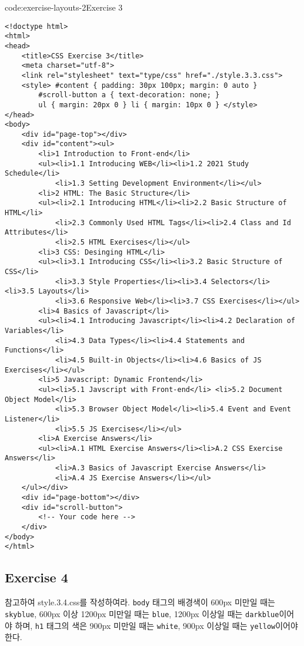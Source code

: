 \begin{codeenv}{code:exercise-layouts-2}{Exercise 3}\begin{verbatim}
<!doctype html>
<html>
<head>
    <title>CSS Exercise 3</title>
    <meta charset="utf-8">
    <link rel="stylesheet" text="type/css" href="./style.3.3.css">
    <style> #content { padding: 30px 100px; margin: 0 auto }
        #scroll-button a { text-decoration: none; }
        ul { margin: 20px 0 } li { margin: 10px 0 } </style>
</head>
<body>
    <div id="page-top"></div>
    <div id="content"><ul>
        <li>1 Introduction to Front-end</li>
        <ul><li>1.1 Introducing WEB</li><li>1.2 2021 Study Schedule</li>
            <li>1.3 Setting Development Environment</li></ul>
        <li>2 HTML: The Basic Structure</li>
        <ul><li>2.1 Introducing HTML</li><li>2.2 Basic Structure of HTML</li>
            <li>2.3 Commonly Used HTML Tags</li><li>2.4 Class and Id Attributes</li>
            <li>2.5 HTML Exercises</li></ul>
        <li>3 CSS: Desinging HTML</li>
        <ul><li>3.1 Introducing CSS</li><li>3.2 Basic Structure of CSS</li>
            <li>3.3 Style Properties</li><li>3.4 Selectors</li> <li>3.5 Layouts</li>
            <li>3.6 Responsive Web</li><li>3.7 CSS Exercises</li></ul>
        <li>4 Basics of Javascript</li>
        <ul><li>4.1 Introducing Javascript</li><li>4.2 Declaration of Variables</li>
            <li>4.3 Data Types</li><li>4.4 Statements and Functions</li>
            <li>4.5 Built-in Objects</li><li>4.6 Basics of JS Exercises</li></ul>
        <li>5 Javascript: Dynamic Frontend</li>
        <ul><li>5.1 Javscript with Front-end</li> <li>5.2 Document Object Model</li>
            <li>5.3 Browser Object Model</li><li>5.4 Event and Event Listener</li>
            <li>5.5 JS Exercises</li></ul>
        <li>A Exercise Answers</li>
        <ul><li>A.1 HTML Exercise Answers</li><li>A.2 CSS Exercise Answers</li>
            <li>A.3 Basics of Javascript Exercise Answers</li>
            <li>A.4 JS Exercise Answers</li></ul>
    </ul></div>
    <div id="page-bottom"></div>
    <div id="scroll-button">
        <!-- Your code here -->
    </div>
</body>
</html>
\end{verbatim}
\end{codeenv}

\subsection*{Exercise 4}
\을 참고하여 style.3.4.css를 작성하여라. \texttt{body} 태그의 배경색이 600px 미만일 때는 \texttt{skyblue}, 600px 이상 1200px 미만일 때는 \texttt{blue}, 1200px 이상일 때는 \texttt{darkblue}이어야 하며, \texttt{h1} 태그의 색은 900px 미만일 때는 \texttt{white}, 900px 이상일 때는 \texttt{yellow}이어야 한다.


